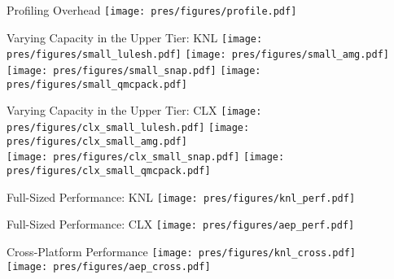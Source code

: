 \documentclass[final,hyperref={pdfpagelabels=false}]{beamer}
\begin{document}
\begin{frame}{Profiling Overhead}
  \centering
  \texttt{[image: pres/figures/profile.pdf]}
\end{frame}

\begin{frame}{Varying Capacity in the Upper Tier: KNL}
  \centering
  \texttt{[image: pres/figures/small\_lulesh.pdf]}
  \texttt{[image: pres/figures/small\_amg.pdf]}
  \\
  \texttt{[image: pres/figures/small\_snap.pdf]}
  \texttt{[image: pres/figures/small\_qmcpack.pdf]}
\end{frame}

\begin{frame}{Varying Capacity in the Upper Tier: CLX}
  \centering
  \texttt{[image: pres/figures/clx\_small\_lulesh.pdf]}
  \texttt{[image: pres/figures/clx\_small\_amg.pdf]}
  \\
  \texttt{[image: pres/figures/clx\_small\_snap.pdf]}
  \texttt{[image: pres/figures/clx\_small\_qmcpack.pdf]}
\end{frame}

\begin{frame}{Full-Sized Performance: KNL}
  \centering
  \texttt{[image: pres/figures/knl\_perf.pdf]}
\end{frame}

\begin{frame}{Full-Sized Performance: CLX}
  \centering
  \texttt{[image: pres/figures/aep\_perf.pdf]}
\end{frame}

\begin{frame}{Cross-Platform Performance}
  \centering
  \texttt{[image: pres/figures/knl\_cross.pdf]}
  \\
  \texttt{[image: pres/figures/aep\_cross.pdf]}
\end{frame}
\end{document}
